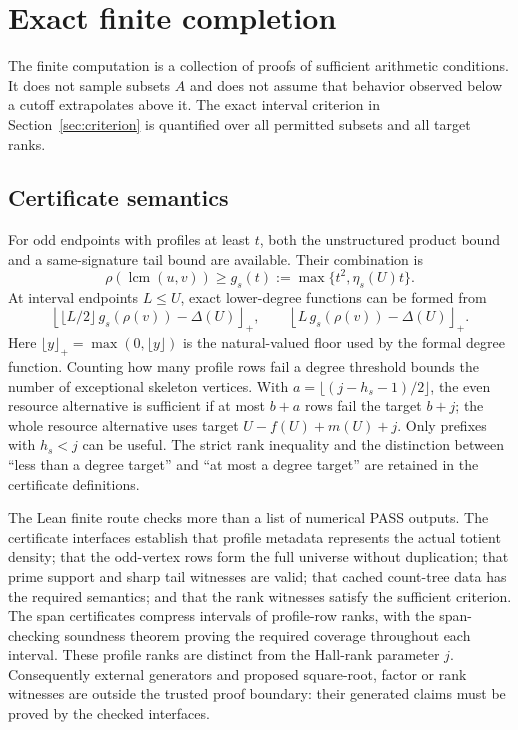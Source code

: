\section{Exact finite completion}\label{sec:finite}
The finite computation is a collection of proofs of sufficient arithmetic conditions. It does not sample subsets $A$ and does not assume that behavior observed below a cutoff extrapolates above it. The exact interval criterion in Section~\ref{sec:criterion} is quantified over all permitted subsets and all target ranks.

\subsection{Certificate semantics}
For odd endpoints with profiles at least $t$, both the unstructured product bound and a same-signature tail bound are available. Their combination is
\[
 \rho(\operatorname{lcm}(u,v))\ge
 g_s(t):=\max\{t^2,\eta_s(U)t\}.
\]
At interval endpoints $L\le U$, exact lower-degree functions can be formed from
\[
 \left\lfloor\lfloor L/2\rfloor\,g_s(\rho(v))-\Delta(U)\right\rfloor_+,
 \qquad
 \left\lfloor L\,g_s(\rho(v))-\Delta(U)\right\rfloor_+.
\]
Here $\lfloor y\rfloor_+=\max(0,\lfloor y\rfloor)$ is the natural-valued floor used by the formal degree function. Counting how many profile rows fail a degree threshold bounds the number of exceptional skeleton vertices. With $a=\lfloor(j-h_s-1)/2\rfloor$, the even resource alternative is sufficient if at most $b+a$ rows fail the target $b+j$; the whole resource alternative uses target $U-f(U)+m(U)+j$. Only prefixes with $h_s<j$ can be useful. The strict rank inequality and the distinction between ``less than a degree target'' and ``at most a degree target'' are retained in the certificate definitions.

The Lean finite route checks more than a list of numerical PASS outputs. The certificate interfaces establish that profile metadata represents the actual totient density; that the odd-vertex rows form the full universe without duplication; that prime support and sharp tail witnesses are valid; that cached count-tree data has the required semantics; and that the rank witnesses satisfy the sufficient criterion. The span certificates compress intervals of profile-row ranks, with the span-checking soundness theorem proving the required coverage throughout each interval. These profile ranks are distinct from the Hall-rank parameter $j$. Consequently external generators and proposed square-root, factor or rank witnesses are outside the trusted proof boundary: their generated claims must be proved by the checked interfaces.

